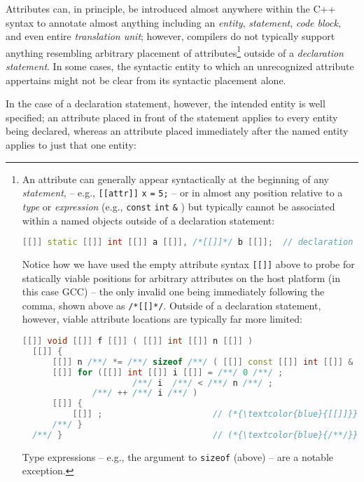 \documentclass[twoside,10pt,letterpaper,usenames]{newstyle-PearsonGeneric-7-38}
\begin{document}
Attributes can, in principle, be introduced almost anywhere within the
C++ syntax to annotate almost anything including an \emph{entity},
\emph{statement}, \emph{code block}, and even entire \emph{translation
unit}; however, compilers do not typically support anything resembling
arbitrary placement of attributes{\cprotect\footnote{An attribute can
  generally appear syntactically at the beginning of any
  \emph{statement}, -- e.g., \texttt{[[attr]]} \texttt{x} \texttt{=}
  \texttt{5;} -- or in almost any position relative to a \emph{type} or
  \emph{expression} (e.g., \texttt{const} \texttt{int} \texttt{\&} ) but
  typically cannot be associated within a named objects outside of a
  declaration statement:

  \begin{lstlisting}[language=C++, basicstyle={\ttfamily\footnotesize}]
  [[]] static [[]] int [[]] a [[]], /*[[]]*/ b [[]];  // declaration statement
  \end{lstlisting}
      

  Notice how we have used the empty attribute syntax \texttt{[[]]} above
  to probe for statically viable positions for arbitrary attributes on
  the host platform (in this case GCC) -- the only invalid one being
  immediately following the comma, shown above as \texttt{/*[[]*/}.
  Outside of a declaration statement, however, viable attribute
  locations are typically far more limited:

  \begin{lstlisting}[language=C++, basicstyle={\ttfamily\footnotesize}]
  [[]] void [[]] f [[]] ( [[]] int [[]] n [[]] )
  [[]] {
      [[]] n /**/ *= /**/ sizeof /**/ ( [[]] const [[]] int [[]] & [[]] ) /**/;
      [[]] for ([[]] int [[]] i [[]] = /**/ 0 /**/ ;
                      /**/ i  /**/ < /**/ n /**/ ;
              /**/ ++ /**/ i /**/ )
      [[]] {
          [[]] ;                      // (*{\textcolor{blue}{[[]]}}*) denotes viable attribute location
      /**/ }
  /**/ }                              // (*{\textcolor{blue}{/**/}}*) denotes no attribute is allowed
  \end{lstlisting}
      

  Type expressions -- e.g., the argument to \texttt{sizeof} (above) --
  are a notable exception.}} outside of a \emph{declaration statement}.
In some cases, the syntactic entity to which an unrecognized attribute
appertains might not be clear from its syntactic placement alone.

In the case of a declaration statement, however, the intended entity is
well specified; an attribute placed in front of the statement applies to
every entity being declared, whereas an attribute placed immediately
after the named entity applies to just that one entity:
\end{document}
